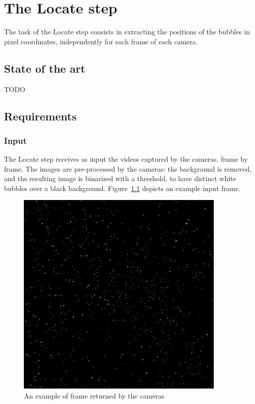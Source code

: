 \chapter{The Locate step}
\label{chap:locate}

The task of the Locate step consists in extracting the positions of the bubbles in pixel coordinates, independently for each frame of each camera.

\section{State of the art}
TODO
\section{Requirements}

\subsection{Input}
The Locate step receives as input the videos captured by the cameras, frame by frame.
The images are pre-processed by the cameras: the background is removed, and the resulting image is binarized with a threshold, to have distinct white bubbles over a black background.
Figure~\ref{fig:locate:original} depicts an example input frame.

\begin{figure}
	\centerline{\includegraphics[width=0.9\textwidth]{images/locate/_original-frame.png}}
	\caption{\centering An example of frame returned by the cameras}
	\label{fig:locate:original}
\end{figure}

